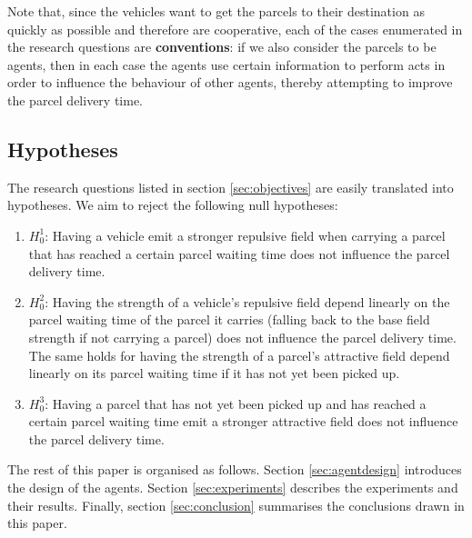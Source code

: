 Note that, since the vehicles want to get the parcels to their destination as quickly as possible and therefore are cooperative, each of the cases enumerated in the research questions are \textbf{conventions}: if we also consider the parcels to be agents, then in each case the agents use certain information to perform acts in order to influence the behaviour of other agents, thereby attempting to improve the parcel delivery time.

\subsection{Hypotheses}\label{sec:hypotheses}
The research questions listed in section \ref{sec:objectives} are easily translated into hypotheses. We aim to reject the following null hypotheses:
\begin{enumerate}
\item $H^1_0$: Having a vehicle emit a stronger repulsive field when carrying a parcel that has reached a certain parcel waiting time does not influence the parcel delivery time.
\item $H^2_0$: Having the strength of a vehicle's repulsive field depend linearly on the parcel waiting time of the parcel it carries (falling back to the base field strength if not carrying a parcel) does not influence the parcel delivery time. The same holds for having the strength of a parcel's attractive field depend linearly on its parcel waiting time if it has not yet been picked up.
\item $H^3_0$: Having a parcel that has not yet been picked up and has reached a certain parcel waiting time emit a stronger attractive field does not influence the parcel delivery time.
\end{enumerate}

The rest of this paper is organised as follows. Section \ref{sec:agentdesign} introduces the design of the agents. Section \ref{sec:experiments} describes the experiments and their results. Finally, section \ref{sec:conclusion} summarises the conclusions drawn in this paper.
